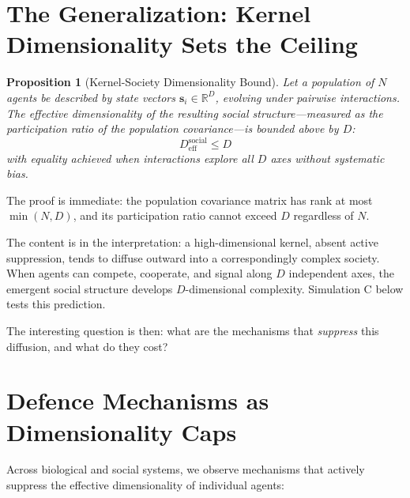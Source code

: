 \documentclass[12pt,a4paper]{article}
\newtheorem{proposition}[theorem]{Proposition}
\begin{document}
\section{The Generalization: Kernel Dimensionality Sets the Ceiling}
\label{sec:generalization}

\begin{proposition}[Kernel-Society Dimensionality Bound]
\label{prop:kernel}
Let a population of $N$ agents be described by state vectors $\mathbf{s}_i \in \mathbb{R}^D$, evolving under pairwise interactions.
The effective dimensionality of the resulting social structure---measured as the participation ratio of the population covariance---is bounded above by $D$:
\begin{equation}
D_{\mathrm{eff}}^{\mathrm{social}} \leq D
\end{equation}
with equality achieved when interactions explore all $D$ axes without systematic bias.
\end{proposition}

The proof is immediate: the population covariance matrix has rank at most $\min(N, D)$, and its participation ratio cannot exceed $D$ regardless of $N$.

The content is in the interpretation: a high-dimensional kernel, absent active suppression, tends to diffuse outward into a correspondingly complex society.
When agents can compete, cooperate, and signal along $D$ independent axes, the emergent social structure develops $D$-dimensional complexity.
Simulation C below tests this prediction.

The interesting question is then: what are the mechanisms that \emph{suppress} this diffusion, and what do they cost?


\section{Defence Mechanisms as Dimensionality Caps}
\label{sec:defence}

Across biological and social systems, we observe mechanisms that actively suppress the effective dimensionality of individual agents:
\end{document}
